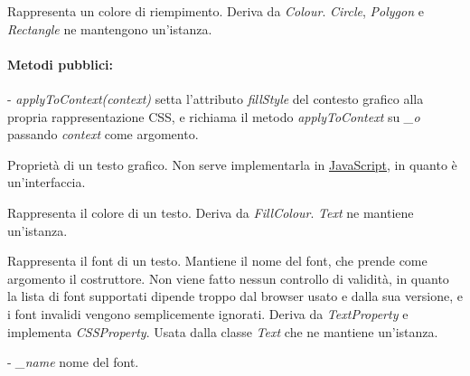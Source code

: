 Rappresenta un colore di riempimento.
Deriva da \textit{Colour}.
\textit{Circle}, \textit{Polygon} e \textit{Rectangle} ne mantengono un'istanza.
\paragraph{Metodi pubblici:}
\begin{elencopuntato}[\subsubsecindent]
\item[-] \textit{applyToContext(context)} setta l'attributo \textit{fillStyle} del contesto grafico alla propria rappresentazione CSS, e richiama il metodo \textit{applyToContext} su \textit{{\_}o} passando \textit{context} come argomento.
\end{elencopuntato}

Propriet\`a di un testo grafico. Non serve implementarla in \underline{JavaScript}, in quanto \`e un'interfaccia.

Rappresenta il colore di un testo.
Deriva da \textit{FillColour}.
\textit{Text} ne mantiene un'istanza.

Rappresenta il font di un testo. Mantiene il nome del font, che prende come argomento il costruttore. Non viene fatto nessun controllo di validit\`a, in quanto la lista di font supportati dipende troppo dal browser usato e dalla sua versione, e i font invalidi vengono semplicemente ignorati. 
Deriva da \textit{TextProperty} e implementa \textit{CSSProperty}.
Usata dalla classe \textit{Text} che ne mantiene un'istanza.
\begin{elencopuntato}[\subsubsecindent]
\item[-] \textit{{\_}name} nome del font.
\end{elencopuntato}
